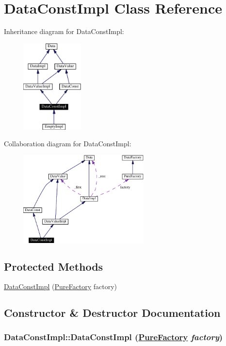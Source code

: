 \hypertarget{classDataConstImpl}{
\section{Data\-Const\-Impl  Class Reference}
\label{classDataConstImpl}
}
Inheritance diagram for Data\-Const\-Impl:\begin{figure}[H]
\begin{center}
\leavevmode
\includegraphics[width=89pt]{classDataConstImpl__inherit__graph}
\end{center}
\end{figure}
Collaboration diagram for Data\-Const\-Impl:\begin{figure}[H]
\begin{center}
\leavevmode
\includegraphics[width=186pt]{classDataConstImpl__coll__graph}
\end{center}
\end{figure}
\subsection*{Protected Methods}
\begin{CompactItemize}
\item 
\hyperlink{classDataConstImpl_b0}{Data\-Const\-Impl} (\hyperlink{classPureFactory}{Pure\-Factory} factory)
\end{CompactItemize}


\subsection{Constructor \& Destructor Documentation}
\hypertarget{classDataConstImpl_b0}{
\subsubsection[DataConstImpl]{\setlength{\rightskip}{0pt plus 5cm}Data\-Const\-Impl::Data\-Const\-Impl (\hyperlink{classPureFactory}{Pure\-Factory} {\em factory})}}
\label{classDataConstImpl_b0}




